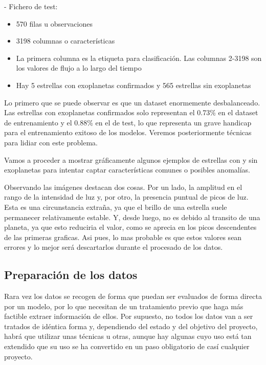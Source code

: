 - Fichero de test:
\begin{itemize}
	\item 570 filas u observaciones
	\item 3198 columnas o características
	\item La primera columna es la etiqueta para clasificación. Las columnas 2-3198 son los valores de flujo a lo largo del tiempo
	\item Hay 5 estrellas con exoplanetas confirmados y 565 estrellas sin exoplanetas
\end{itemize}

Lo primero que se puede observar es que un dataset enormemente desbalanceado. Las estrellas con exoplanetas confirmados solo representan el 0.73\% en el dataset de entrenamiento y el 0.88\% en el de test, lo que representa un grave handicap para el entrenamiento exitoso de los modelos. Veremos posteriormente técnicas para lidiar con este problema.

Vamos a proceder a mostrar gráficamente algunos ejemplos de estrellas con y sin exoplanetas para intentar captar características comunes o posibles anomalías.



Observando las imágenes destacan dos cosas. Por un lado, la amplitud en el rango de la intensidad de luz y, por otro, la presencia puntual de picos de luz. Esta es una circunstancia extraña, ya que el brillo de una estrella suele permanecer relativamente estable. Y, desde luego, no es debido al transito de una planeta, ya que esto reduciria el valor, como se aprecia en los picos descendentes de las primeras graficas. Asi pues, lo mas probable es que estos valores sean errores y lo mejor será descartarlos durante el procesado de los datos.

\subsection{Preparación de los datos}

Rara vez los datos se recogen de forma que puedan ser evaluados de forma directa por un modelo, por lo que necesitan de un tratamiento previo que haga más factible extraer información de ellos. Por supuesto, no todos los datos van a ser tratados de idéntica forma y, dependiendo del estado y del objetivo del proyecto, habrá que utilizar unas técnicas u otras, aunque hay algunas cuyo uso está tan extendido que su uso se ha convertido en un paso obligatorio de casí cualquier proyecto.

